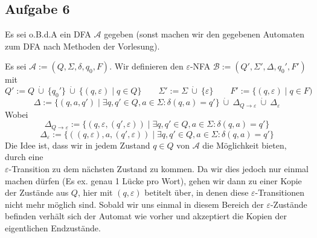 \documentclass[a4paper,graphics,11pt]{article}
\newcommand{\aufgabe}[1]{\subsection*{Aufgabe #1}}
\begin{document}

\newpage
\aufgabe{6}
Es sei o.B.d.A ein DFA $\mathcal{A}$ gegeben (sonst machen wir den gegebenen Automaten zum DFA nach Methoden
der Vorlesung).

Es sei $\mathcal{A} := (Q, \Sigma, \delta, q_0, F)$.
Wir definieren den $\varepsilon$-NFA $\mathcal{B} := (Q', \Sigma', \Delta, q_0', F')$ mit
$$
    Q' := Q\ \dot\cup\ \{q_0'\}\ \dot\cup\ \{(q, \varepsilon) \mid q \in Q\}
    \qquad \Sigma' := \Sigma\ \dot\cup\ \{\varepsilon\}
    \qquad F' := \{(q, \varepsilon) \mid q \in F)
$$$$
    \Delta := \{(q, a, q') \mid \exists q,q' \in Q, a \in \Sigma : \delta(q, a) = q'\}\ \dot\cup\ \Delta_{Q \to \varepsilon}\ \dot\cup\ \Delta_\varepsilon
$$
Wobei
$$
    \Delta_{Q \to \varepsilon} := \{(q, \varepsilon, (q', \varepsilon)) \mid \exists q,q' \in Q, a \in \Sigma : \delta(q, a) = q'\}
$$$$
    \Delta_\varepsilon := \{((q, \varepsilon), a, (q', \varepsilon)) \mid \exists q,q' \in Q, a \in \Sigma : \delta(q, a) = q'\}
$$
Die Idee ist, dass wir in jedem Zustand $q \in Q$ von $\mathcal{A}$ die Möglichkeit bieten, durch eine\\
$\varepsilon$-Transition zu dem nächsten Zustand zu kommen. Da wir dies jedoch nur einmal machen dürfen
(Es ex. genau 1 Lücke pro Wort), gehen wir dann zu einer Kopie der Zustände aus $Q$, hier mit $(q, \varepsilon)$
betitelt über, in denen diese $\varepsilon$-Transitionen nicht mehr möglich sind. Sobald wir uns einmal in diesem
Bereich der $\varepsilon$-Zustände befinden verhält sich der Automat wie vorher und akzeptiert die Kopien der 
eigentlichen Endzustände.
\end{document}
